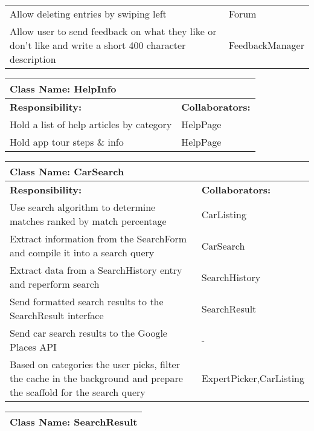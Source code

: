 \documentclass[12pt]{article}
\begin{document}
\begin{enumerate}[a)]
\begin{table}[ht]
\begin{tabular}{|p{5cm}|p{5cm}|}
	    Allow deleting entries by swiping left & Forum \\
	    Allow user to send feedback on what they like or don't like and write a short 400 character description & FeedbackManager\\
		\hline
		\end{tabular}
	\end{table}
	\begin{table}[ht]
		\centering
		\begin{tabular}{|p{5cm}|p{5cm}|}
		\hline 
		 \multicolumn{2}{|l|}{\textbf{Class Name:} HelpInfo} \\
		\hline
		\textbf{Responsibility:} & \textbf{Collaborators:} \\
		\hline
		Hold a list of help articles by category & HelpPage\\
	    Hold app tour steps \& info & HelpPage \\
		\hline
		\end{tabular}
	\end{table}
	\begin{table}[ht]
		\centering
		\begin{tabular}{|p{5cm}|p{5cm}|}
		\hline 
		 \multicolumn{2}{|l|}{\textbf{Class Name:} CarSearch} \\
		\hline
		\textbf{Responsibility:} & \textbf{Collaborators:} \\
		\hline
		Use search algorithm to determine matches ranked by match percentage & CarListing\\
	    Extract information from the SearchForm and compile it into a search query & CarSearch\\
	    Extract data from a SearchHistory entry and reperform search & SearchHistory\\
	    Send formatted search results to the SearchResult interface & SearchResult\\
	    Send car search results to the Google Places API & - \\
	    Based on categories the user picks, filter the cache in the background and prepare the scaffold for the search query & ExpertPicker,CarListing\\
		\hline
		\end{tabular}
	\end{table}
	\begin{table}[ht]
		\centering
		\begin{tabular}{|p{5cm}|p{5cm}|}
		\hline 
		 \multicolumn{2}{|l|}{\textbf{Class Name:} SearchResult} \\
		\hline

\end{tabular}
\end{table}
\end{enumerate}
\end{document}
